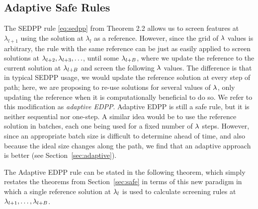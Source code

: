 \subsection{Adaptive Safe Rules}

The SEDPP rule \eqref{eq:sedpp} from Theorem 2.2 allows us to screen features at $\lambda_{l+1}$ using the solution at $\lambda_l$ as a reference. However, since the grid of $\lambda$ values is arbitrary, the rule with the same reference can be just as easily applied to screen solutions at $\lambda_{l+2}, \lambda_{l+3}, \ldots$, until some $\lambda_{l+B}$, where we update the reference to the current solution at $\lambda_{l+B}$ and screen the following $\lambda$ values.  The difference is that in typical SEDPP usage, we would update the reference solution at every step of path; here, we are proposing to re-use solutions for several values of $\lambda$, only updating the reference when it is computationally beneficial to do so.  We refer to this modification as \emph{adaptive EDPP}.  Adaptive EDPP is still a safe rule, but it is neither sequential nor one-step.   A similar idea would be to use the reference solution in batches, each one being used for a fixed number of $\lambda$ steps.  However, since an appropriate batch size is difficult to determine ahead of time, and also because the ideal size changes along the path, we find that an adaptive approach is better (see Section~\ref{sec:adaptive}).

The Adaptive EDPP rule can be stated in the following theorem, which simply restates the theorems from Section~\ref{sec:safe} in terms of this new paradigm in which a single reference solution at $\lambda_l$ is used to calculate screening rules at $\lambda_{l+1}, \ldots, \lambda_{l+B}$.

